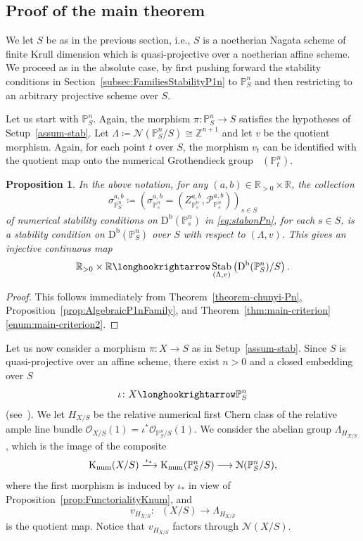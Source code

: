 \documentclass[11pt, reqno]{amsart}
\numberwithin{equation}{section}
\theoremstyle{plain}
\newtheorem{proposition}[theorem]{Proposition}
\theoremstyle{remark}
\theoremstyle{definition}
\theoremstyle{italicsname}
\newcommand{\Db}{\mathrm{D^b}}
\newcommand{\num}{\mathrm{num}}
\DeclareMathOperator{\Knum}{\rK_{\num}}
\DeclareMathOperator{\Stab}{Stab}
\newcommand{\cO}{\mathcal{O}}
\newcommand{\cN}{\mathcal{N}}
\newcommand{\cP}{\mathscr{P}}
\newcommand{\rK}{\mathrm{K}}
\def\RR{\ensuremath{\mathbb{R}}}
\def\ZZ{\ensuremath{\mathbb{Z}}}
\def\PP{\ensuremath{\mathbb{P}}}
\def\citestacks#1{\cite[\href{https://stacks.math.columbia.edu/tag/#1}{#1}]{stacks-project}}
\begin{document}
\subsection{Proof of the main theorem}\label{subsec:ProofMainTheorem}

We let $S$ be as in the previous section, i.e., $S$ is a noetherian Nagata scheme of finite Krull dimension which is quasi-projective over a noetherian affine scheme. 
We proceed as in the absolute case, by first pushing forward the stability conditions in Section~\ref{subsec:FamiliesStabilityP1n} to $\PP^n_S$ and then restricting to an arbitrary projective scheme over $S$.

Let us start with $\PP^n_S$.
Again, the morphism $\pi \colon\PP^n_S\rightarrow S$ satisfies the hypotheses of Setup~\ref{assum-stab}.
Let $\Lambda\coloneqq\cN(\PP^n_S/S)\cong\ZZ^{n+1}$ and let $v$ be the quotient morphism.
Again, for each point $t$ over $S$, the morphism $v_t$ can be identified with the quotient map onto the numerical Grothendieck group $\Knum(\PP^n_t)$.

\begin{proposition}\label{prop:AlgebraicPnFamily}
In the above notation, for any $(a,b)\in\RR_{>0}\times\RR$, the collection 
\[
{\sigma}^{a,b}_{\PP^n_S}\coloneqq\left(\sigma_{\PP^n_s}^{a,b}=\left(Z^{a,b}_{\PP^n_s},\cP_{\PP^n_s}^{a,b}\right)\right)_{s\in S}
\]
of numerical stability conditions on $\Db(\PP^n_s)$ in \eqref{eq:stabonPn}, for each $s\in S$, is a stability condition on $\Db(\PP^n_S)$ over $S$ with respect to $(\Lambda,v)$.
This gives an injective continuous map
\[
\RR_{>0}\times\RR\longhookrightarrow\Stab_{(\Lambda,v)}\left(\Db(\PP^n_S)/S\right).
\]
\end{proposition}

\begin{proof}
This follows immediately from Theorem~\ref{theorem-chunyi-Pn}, Proposition~\ref{prop:AlgebraicP1nFamily}, and Theorem~\ref{thm:main-criterion}\ref{enum:main-criterion2}.
\end{proof}

Let us now consider a morphism $\pi \colon X\to S$ as in Setup~\ref{assum-stab}.
Since $S$ is quasi-projective over an affine scheme, there exist $n>0$ and a closed embedding over $S$
\[
\iota\colon X\longhookrightarrow\PP^n_S
\]
(see~\citestacks{087S}).
We let $H_{X/S}$ be the relative numerical first Chern class of the relative ample line bundle $\cO_{X/S}(1)=\iota^*\cO_{\PP^n_S/S}(1)$.
We consider the abelian group $\Lambda_{H_{X/S}}$, which is the image of the composite
\[
\Knum(X/S)\xlongrightarrow{\iota_*}\Knum(\PP^n_S/S)\longrightarrow\cN(\PP^n_S/S),
\]
where the first morphism is induced by $\iota_*$ in view of Proposition~\ref{prop:FunctorialityKnum}, and 
\begin{equation}
\label{definition-vHXS}
v_{H_{X/S}}\colon\Knum(X/S)\longrightarrow\Lambda_{H_{X/S}}
\end{equation}
is the quotient map.
Notice that $v_{H_{X/S}}$ factors through $\cN(X/S)$.
\end{document}

